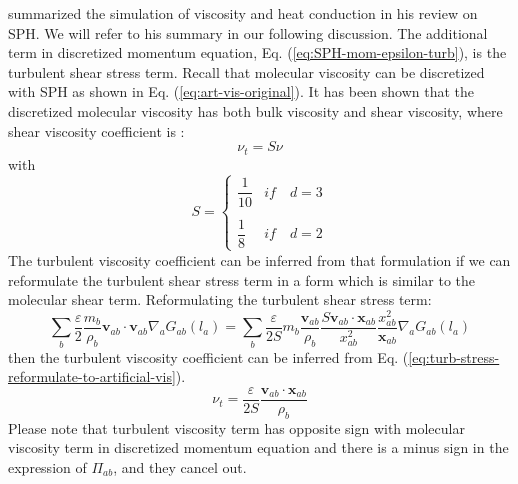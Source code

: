 \citet{monaghan2005smoothed} summarized the simulation of viscosity and heat conduction in his review on SPH. We will refer to his summary in our following discussion. The additional term in discretized momentum equation, Eq. (\ref{eq:SPH-mom-epsilon-turb}), is the turbulent shear stress term. 
Recall that molecular viscosity can be discretized with SPH as shown in Eq. (\ref{eq:art-vis-original}). 
It has been shown that the discretized molecular viscosity has both bulk viscosity and shear viscosity, where shear viscosity coefficient is \citep{monaghan2005smoothed}:
\begin{equation}
\nu_t = S \nu
\end{equation}
with
\begin{equation}
S= 
\begin{cases} 
      \dfrac{1}{10} & if  \quad d=3 \\
      \\
     \dfrac{1}{8}  & if  \quad d=2 
\end{cases}
\end{equation}
The turbulent viscosity coefficient can be inferred from that formulation if we can reformulate the turbulent shear stress term in a form which is similar to the molecular shear term.
Reformulating the turbulent shear stress term:
\begin{equation}
\label{eq:turb-stress-reformulate-to-artificial-vis}
 \sum_b \dfrac{\varepsilon}{2} \dfrac{m_b}{\rho_b} \textbf{v}_{ab} \cdot \textbf{v}_{ab} \nabla_a G_{ab}\left(l_a\right)= \sum_b \dfrac{\varepsilon}{2S} m_b \dfrac{\textbf{v}_{ab}}{\rho_b} \dfrac{S \textbf{v}_{ab} \cdot \textbf{x}_{ab}}{x_{ab}^2} \dfrac{x_{ab}^2}{\textbf{x}_{ab}} \nabla_a G_{ab}\left(l_a\right) 
\end{equation}
then the turbulent viscosity coefficient can be inferred from Eq. (\ref{eq:turb-stress-reformulate-to-artificial-vis}).
\begin{equation}
\nu_t = \dfrac{\varepsilon}{2S} \dfrac{\textbf{v}_{ab} \cdot \textbf{x}_{ab}}{\rho_b}
\end{equation}
Please note that turbulent viscosity term has opposite sign with molecular viscosity term in discretized momentum equation and there is a minus sign in the expression of $\Pi_{ab}$, and they cancel out.

